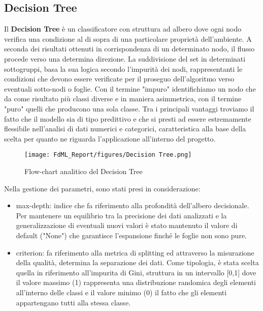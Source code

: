 \documentclass[10pt,a4paper]{article}
\begin{document}
\subsection{Decision Tree}
 Il \textbf{Decision Tree}  è un classificatore con struttura ad albero dove ogni nodo verifica una condizione al di sopra di una particolare proprietà dell'ambiente. \hfill \break
 A seconda dei risultati ottenuti in corrispondenza di un determinato nodo, il flusso procede verso una determina direzione.\hfill \break
 La suddivisione del set in determinati sottogruppi, basa la sua logica secondo l'impurità dei nodi, rappresentanti le condizioni che devono essere verificate per il proseguo dell'algoritmo verso eventuali sotto-nodi o foglie.\hfill \break
 Con il termine "impuro" identifichiamo un nodo che da come risultato più classi diverse e in maniera asimmetrica, con il termine "puro" quelli che producono una sola classe.
 Tra i principali vantaggi troviamo il fatto che il modello sia di tipo predittivo e che si presti ad essere estremamente flessibile nell'analisi di dati numerici e categorici, caratteristica alla base della scelta per quanto ne riguarda l'applicazione all'interno del progetto.
 
 
 \begin{figure}[ht]
     \centering
     \texttt{[image: FdML\_Report/figures/Decision Tree.png]}
     \caption{Flow-chart analitico del Decision Tree}
     \label{fig:my_label}
 \end{figure}
 
 Nella gestione dei parametri, sono stati presi in considerazione:

 \begin{itemize}
     \item max-depth: indice che fa riferimento alla profondità dell'albero decisionale.\hfill \break
     Per mantenere un equilibrio tra la precisione dei dati analizzati e la generalizzazione di eventuali nuovi valori è stato mantenuto il valore di default ("None") che garantisce l'espansione finché le foglie non sono pure.
 \end{itemize}
 
 \begin{itemize}
     \item criterion: fa riferimento alla metrica di splitting ed attraverso la misurazione della qualità, determina la separazione dei dati.\hfill \break
     Come tipologia, è stata scelta quella in riferimento all'impurita di Gini, struttura in un intervallo [0,1] dove il valore massimo (1) rappresenta una distribuzione randomica degli elementi all'interno delle classi e il valore minimo (0) il fatto che gli elementi appartengano tutti alla stessa classe.
 \end{itemize}
 \clearpage
 
\end{document}
